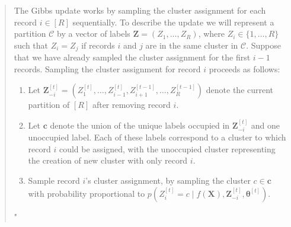 \documentclass{article}
\newcommand{\bX}{\boldsymbol X}
\newcommand{\bZ}{ \boldsymbol Z}
\newcommand{\bc}{\boldsymbol c}
\newcommand{\btheta}{\boldsymbol \theta}
\newcommand{\C}{\mathcal{C}}
\begin{document}
\begin{enumerate}
\begin{quote}
The Gibbs update works by sampling the cluster assignment for each record $i \in [R]$ sequentially. To describe the update we will represent a partition $\C$ by a  vector of labels $\bZ=(Z_1,\dots, Z_R)$, where $Z_i\in\{1,\dots, R\}$ such that $Z_i=Z_j$ if records $i$ and $j$ are in the same cluster in $\C$. Suppose that we have already sampled the cluster assignment for the first $i-1$ records. Sampling the cluster assignment for record $i$ proceeds as follows:
			\begin{enumerate}
				\item Let $\bZ^{[t]}_{-i}=(Z_1^{[t]},\dots,Z_{i-1}^{[t]},Z_{i+1}^{[t-1]},\dots, Z_R^{[t-1]})$ denote the current partition of $[R]$ after removing record $i$. 
				\item Let $\bc$ denote the union of the unique labels occupied in $\bZ^{[t]}_{-i}$ and one unoccupied label. Each of these labels correspond to a cluster to which record $i$ could be assigned, with the unoccupied cluster representing the creation of new cluster with only record $i$.
				\item Sample record $i$'s cluster assignment, by sampling the cluster $c\in \bc$ with probability proportional to $p(Z_{i}^{[t]}=c\mid f(\bX), \bZ^{[t]}_{-i}, \btheta^{[t]})$.
			\end{enumerate}
			"

\end{quote}

\end{enumerate}
\end{document}
